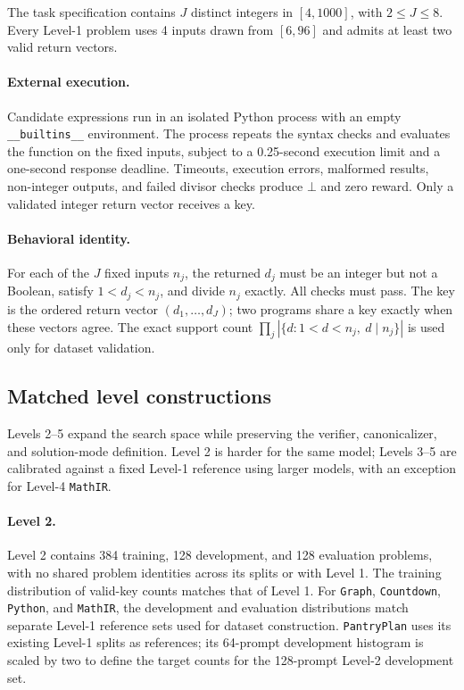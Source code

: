 The task specification contains $J$ distinct integers in $[4,1000]$, with
$2\le J\le8$. Every Level-1 problem uses 4 inputs drawn from
$[6,96]$ and admits at least two valid return vectors.

\paragraph{External execution.}
\label{app:python-process}
Candidate expressions run in an isolated Python process with an empty
\texttt{\_\_builtins\_\_} environment. The process repeats the syntax checks
and evaluates the function on the fixed inputs, subject to a 0.25-second
execution limit and a one-second response deadline. Timeouts, execution errors,
malformed results, non-integer outputs, and failed divisor checks produce
$\bot$ and zero reward. Only a validated integer return vector receives a key.

\paragraph{Behavioral identity.}
\label{app:python-identity}
For each of the $J$ fixed inputs $n_j$, the returned $d_j$ must be an integer
but not a Boolean, satisfy $1<d_j<n_j$, and divide $n_j$ exactly. All checks
must pass. The key is the ordered return vector $(d_1,\ldots,d_J)$;
two programs share a key exactly when these vectors agree. The exact support count
$\prod_j|\{d:1<d<n_j,\ d\mid n_j\}|$ is used only for dataset validation.

\subsection{Matched level constructions}
\label{app:data-levels}

Levels 2--5 expand the search space while preserving the verifier,
canonicalizer, and solution-mode definition. Level 2 is harder for the same
model; Levels 3--5 are calibrated against a fixed Level-1 reference using
larger models, with an exception for Level-4 \texttt{MathIR}.

\paragraph{Level 2.}
Level 2 contains 384 training, 128 development, and 128 evaluation problems,
with no shared problem identities across its splits or with Level 1.
The training distribution of valid-key counts matches that of Level 1.
For \texttt{Graph}, \texttt{Countdown}, \texttt{Python}, and \texttt{MathIR},
the development and evaluation distributions match separate Level-1 reference
sets used for dataset construction. \texttt{PantryPlan} uses its existing
Level-1 splits as references; its 64-prompt development histogram is scaled
by two to define the target counts for the 128-prompt Level-2 development set.


